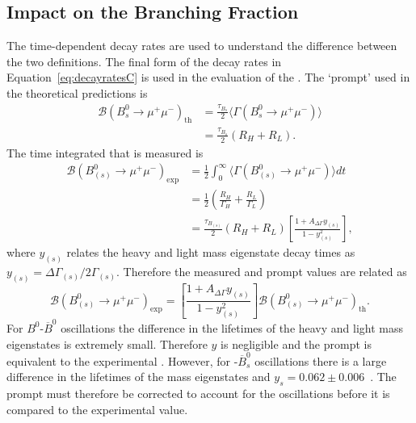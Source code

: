 \subsection{Impact on the Branching Fraction}
\label{sec:BFimpact}
The time-dependent decay rates are used to understand the difference between the two \BF definitions. The final form of the decay rates in Equation~\ref{eq:decayratesC} is used in the evaluation of the \BFs. The `prompt' \BF used in the theoretical predictions is
\begin{align}
\mathcal{B}(B^{0}_{s} \to \mu^{+} \mu^{-})_{\mathrm{th}} &= \frac{\tau_{B_{s}}}{2} \langle \Gamma(B^{0}_{s} \to \mu^{+} \mu^{-}) \rangle \\
&=\frac{\tau_{B_{s}}}{2} (R_{H} + R_{L}).
\end{align}
The time integrated \BF that is measured is
\begin{align}
  \mathcal{B}(B^{0}_{(s)} \to \mu^{+}\mu^{-})_{\mathrm{exp}} &= \frac{1}{2} \int^{\infty}_0 \langle \Gamma (B^{0}_{(s)} \to \mu^{+}\mu^{-}) \rangle  dt \nonumber \\
&= \frac{1}{2} \left( \frac{R_{H}}{\Gamma_{H}} + \frac{R_{L}}{\Gamma_{L}} \right) \nonumber \\
&= \frac{\tau_{B_{(s)}}}{2}(R_{H} + R_{L}) \left[ \frac{1 + A_{\Delta\Gamma}y_{(s)}}{1 - y_{(s)}^{2}} \right],
\end{align}
where $y_{(s)}$ relates the heavy and light mass eigenstate decay times as $y_{(s)} = \Delta \Gamma_{(s)} / 2\Gamma_{(s)}$. Therefore the measured and prompt \BF values are related as
\begin{equation}
  \mathcal{B}(B^0_{(s)} \to \mu^+\mu^-)_{\mathrm{exp}} = \left[ \frac{1 + A_{\Delta\Gamma}y_{(s)}}{1 - y_{(s)}^{2}} \right] \mathcal{B}(B^0_{(s)} \to \mu^+ \mu^-)_{\mathrm{th}}.
\end{equation}
For $B^0$-$\overline{B}^0$ oscillations the difference in the lifetimes of the heavy and light mass eigenstates is extremely small. Therefore $y$ is negligible and the prompt \BF is equivalent to the experimental \BF. However, for \bs-$\overline{B}^0_s$ oscillations there is a large difference in the lifetimes of the mass eigenstates and $y_s =0.062 \pm 0.006$~\cite{Amhis:2016xyh}. The prompt \BF must therefore be corrected to account for the oscillations before it is compared to the experimental value.
